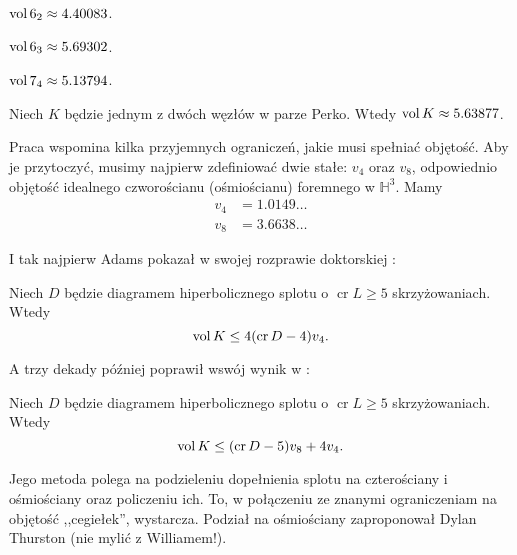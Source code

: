 \begin{example}
    $\operatorname{vol} 6_2 \approx 4.40083$.
\end{example}

\begin{example}
    $\operatorname{vol} 6_3 \approx 5.69302$.
\end{example}

\begin{example}
    $\operatorname{vol} 7_4 \approx 5.13794$.
\end{example}

\begin{example}
    Niech $K$ będzie jednym z dwóch węzłów w parze Perko.
    Wtedy $\operatorname{vol} K \approx 5.63877$.
\end{example}

Praca \cite{purcell19} wspomina kilka przyjemnych ograniczeń, jakie musi spełniać objętość.
Aby je przytoczyć, musimy najpierw zdefiniować dwie stałe: $v_4$ oraz $v_8$, odpowiednio objętość idealnego czworościanu (ośmiościanu) foremnego w $\mathbb H^3$.
Mamy
\begin{align}
    v_4 & = 1.0149\ldots \\
    v_8 & = 3.6638\ldots
\end{align}

I tak najpierw Adams pokazał w swojej rozprawie doktorskiej \cite{adams83}:

\begin{proposition}
    Niech $D$ będzie diagramem hiperbolicznego splotu o $\operatorname{cr} L \ge 5$ skrzyżowaniach.
    Wtedy
    \begin{equation}
        \operatorname{vol} K \le 4 (\operatorname{cr} D - 4) v_4.
    \end{equation} 
\end{proposition}

A trzy dekady później poprawił wswój wynik w \cite{adams13}:

\begin{proposition}
    Niech $D$ będzie diagramem hiperbolicznego splotu o $\operatorname{cr} L \ge 5$ skrzyżowaniach.
    Wtedy
    \begin{equation}
        \operatorname{vol} K \le (\operatorname{cr} D - 5) v_8 + 4v_4.
    \end{equation} 
\end{proposition}

Jego metoda polega na podzieleniu dopełnienia splotu na czterościany i ośmiościany oraz policzeniu ich.
To, w połączeniu ze znanymi ograniczeniam na objętość ,,cegiełek'', wystarcza.
Podział na ośmiościany zaproponował Dylan Thurston (nie mylić z Williamem!).

